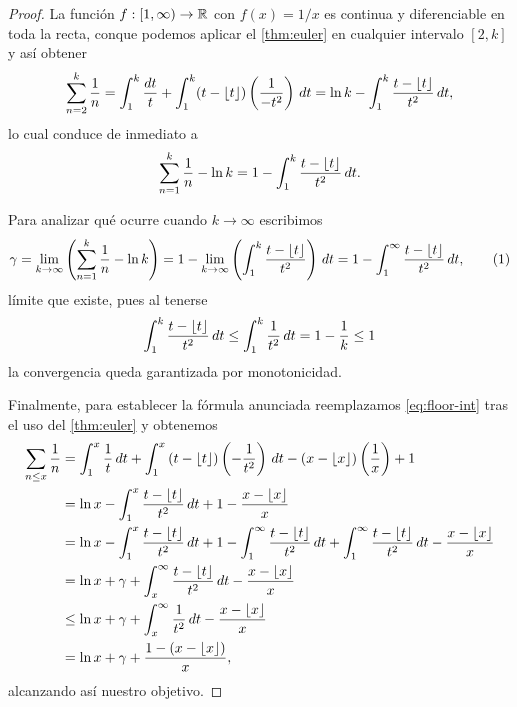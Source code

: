 \begin{proof}
  La funci\'on \(f : [1, \infty) \to \mathbb{R}\) con \(f(x)=1/x\) es continua y
  diferenciable en toda la recta, conque podemos aplicar el \cref{thm:euler}
  en cualquier intervalo \([2, k]\)
  y as\'i obtener
  \[
    \sum_{n = 2}^k \frac{1}{n} =
    \int_1^k \frac{dt}{t} + \int_{1}^k (t - \left\lfloor t \right\rfloor)\left( \frac{1}{-t^2} \right) \, dt
    = \ln k - \int_1^k \frac{t - \left\lfloor t \right\rfloor}{t^2} \, dt,
  \]
  lo cual conduce de inmediato a 
  \[
    \sum_{n = 1}^k \frac{1}{n} - \ln k
    = 1 - \int_1^k \frac{t - \left\lfloor t \right\rfloor}{t^2} \, dt.
  \]
  
  Para analizar qu\'e ocurre cuando \(k \to \infty\) escribimos
  \[
    \gamma = \lim_{k \to \infty} \parentheses{\sum_{n = 1}^k \frac{1}{n} - \ln k}
    = 1 - \lim_{k \to \infty}  \parentheses{\int_1^k \frac{t - \floor{t}}{t^2}} \, dt
    = 1 - \int_1^\infty \frac{t - \floor{t}}{t^2} \, dt,
    \eqlabel{eq:floor-int}
  \]
  l\'imite que existe, pues al tenerse 
  \begin{align*}
    \int_1^k \frac{t - \left\lfloor t \right\rfloor}{t^2} \, dt
    \le \int_1^k \frac{1}{t^2} \, dt
    = 1 -\frac{1}{k}
    \le 1
  \end{align*}
  la convergencia queda garantizada por monotonicidad.
  
  Finalmente, para establecer la f\'ormula anunciada
  reemplazamos \eqref{eq:floor-int} tras el uso del \cref{thm:euler} y obtenemos
  \begin{align*}
    \sum_{n \leq x} \frac{1}{n} &= \int_1^x \frac{1}{t} \, dt +
    \int_1^x \left( t - \left\lfloor t \right\rfloor \right) \left( -\frac{1}{t^2} \right) \, dt
    - \left( x - \left\lfloor x \right\rfloor \right) \left( \frac{1}{x} \right) + 1 \\
    &= \ln x - \int_1^x \frac{t - \left\lfloor t \right\rfloor}{t^2} \, dt + 1 - \frac{x - \left\lfloor x \right\rfloor}{x} \\
    &= \ln x - \int_1^x \frac{t - \left\lfloor t \right\rfloor}{t^2} \, dt
    + 1 - \int_1^{\infty} \frac{t - \left\lfloor t \right\rfloor}{t^2} \, dt +
    \int_1^{\infty} \frac{t - \left\lfloor t \right\rfloor}{t^2} \, dt
    - \frac{x - \left\lfloor x \right\rfloor}{x} \\
    &= \ln x + \gamma + \int_x^{\infty} \frac{t - \left\lfloor t \right\rfloor}{t^2} \, dt
    - \frac{x - \left\lfloor x \right\rfloor}{x} \\
    &\leq \ln x + \gamma + \int_x^{\infty} \frac{1}{t^2} \, dt - \frac{x - \left\lfloor x \right\rfloor}{x} \\
    &= \ln x + \gamma + \frac{1 - \left( x - \left\lfloor x \right\rfloor \right)}{x},
  \end{align*}
  alcanzando as\'i nuestro objetivo.
\end{proof}


